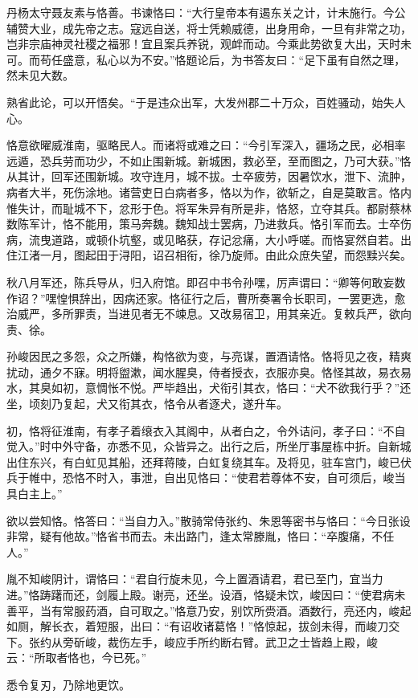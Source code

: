 \documentclass[12pt,UTF8]{ctexbook}
\begin{document}
丹杨太守聂友素与恪善。书谏恪曰：“大行皇帝本有遏东关之计，计未施行。今公辅赞大业，成先帝之志。寇远自送，将士凭赖威德，出身用命，一旦有非常之功，岂非宗庙神灵社稷之福邪！宜且案兵养锐，观衅而动。今乘此势欲复大出，天时未可。而苟任盛意，私心以为不安。”恪题论后，为书答友曰：“足下虽有自然之理，然未见大数。

熟省此论，可以开悟矣。“于是违众出军，大发州郡二十万众，百姓骚动，始失人心。

恪意欲曜威淮南，驱略民人。而诸将或难之曰：“今引军深入，疆场之民，必相率远遁，恐兵劳而功少，不如止围新城。新城困，救必至，至而图之，乃可大获。”恪从其计，回军还围新城。攻守连月，城不拔。士卒疲劳，因暑饮水，泄下、流肿，病者大半，死伤涂地。诸营吏日白病者多，恪以为作，欲斩之，自是莫敢言。恪内惟失计，而耻城不下，忿形于色。将军朱异有所是非，恪怒，立夺其兵。都尉蔡林数陈军计，恪不能用，策马奔魏。魏知战士罢病，乃进救兵。恪引军而去。士卒伤病，流曳道路，或顿仆坑壑，或见略获，存记忿痛，大小呼嗟。而恪宴然自若。出住江渚一月，图起田于浔阳，诏召相衔，徐乃旋师。由此众庶失望，而怨黩兴矣。

秋八月军还，陈兵导从，归入府馆。即召中书令孙嘿，厉声谓曰：“卿等何敢妄数作诏？”嘿惶惧辞出，因病还家。恪征行之后，曹所奏署令长职司，一罢更选，愈治威严，多所罪责，当进见者无不竦息。又改易宿卫，用其亲近。复敕兵严，欲向责、徐。

孙峻因民之多怨，众之所嫌，构恪欲为变，与亮谋，置酒请恪。恪将见之夜，精爽扰动，通夕不寐。明将盥漱，闻水腥臭，侍者授衣，衣服亦臭。恪怪其故，易衣易水，其臭如初，意惆怅不悦。严毕趋出，犬衔引其衣，恪曰：“犬不欲我行乎？”还坐，顷刻乃复起，犬又衔其衣，恪令从者逐犬，遂升车。

初，恪将征淮南，有孝子着缞衣入其阁中，从者白之，令外诘问，孝子曰：“不自觉入。”时中外守备，亦悉不见，众皆异之。出行之后，所坐厅事屋栋中折。自新城出住东兴，有白虹见其船，还拜蒋陵，白虹复绕其车。及将见，驻车宫门，峻已伏兵于帷中，恐恪不时入，事泄，自出见恪曰：“使君若尊体不安，自可须后，峻当具白主上。”

欲以尝知恪。恪答曰：“当自力入。”散骑常侍张约、朱恩等密书与恪曰：“今日张设非常，疑有他故。”恪省书而去。未出路门，逢太常滕胤，恪曰：“卒腹痛，不任人。”

胤不知峻阴计，谓恪曰：“君自行旋未见，今上置酒请君，君已至门，宜当力进。”恪踌躇而还，剑履上殿。谢亮，还坐。设酒，恪疑未饮，峻因曰：“使君病未善平，当有常服药酒，自可取之。”恪意乃安，别饮所赍酒。酒数行，亮还内，峻起如厕，解长衣，着短服，出曰：“有诏收诸葛恪！”恪惊起，拔剑未得，而峻刀交下。张约从旁斫峻，裁伤左手，峻应手所约断右臂。武卫之士皆趋上殿，峻云：“所取者恪也，今已死。”

悉令复刃，乃除地更饮。
\end{document}
